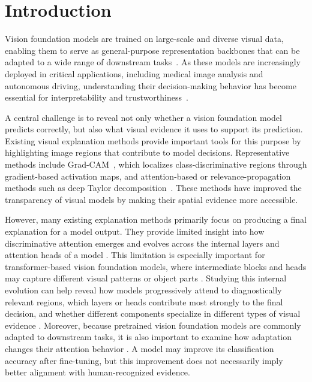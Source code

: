 \documentclass[lineno,pdflatex,sn-mathphys-num]{sn-jnl}%
\theoremstyle{thmstyleone}%
\theoremstyle{thmstyletwo}%
\theoremstyle{thmstylethree}%
\begin{document}


\maketitle

\clearpage

\section{Introduction}

Vision foundation models are trained on large-scale and diverse visual data, enabling them to serve as general-purpose representation backbones that can be adapted to a wide range of downstream tasks~\cite{Awais25PAMI}. As these models are increasingly deployed in critical applications, including medical image analysis and autonomous driving, understanding their decision-making behavior has become essential for interpretability and trustworthiness~\cite{Hasic26NN, Remi25IF, Wan26PAMI, Kashefi2026review}.

A central challenge is to reveal not only whether a vision foundation model predicts correctly, but also what visual evidence it uses to support its prediction. Existing visual explanation methods provide important tools for this purpose by highlighting image regions that contribute to model decisions. Representative methods include Grad-CAM~\cite{Selvaraju17GradCAM}, which localizes class-discriminative regions through gradient-based activation maps, and attention-based or relevance-propagation methods such as deep Taylor decomposition~\cite{Chefer21Interp}. These methods have improved the transparency of visual models by making their spatial evidence more accessible.

However, many existing explanation methods primarily focus on producing a final explanation for a model output. They provide limited insight into how discriminative attention emerges and evolves across the internal layers and attention heads of a model \cite{Voita19Heads}. This limitation is especially important for transformer-based vision foundation models, where intermediate blocks and heads may capture different visual patterns or object parts \cite{Caron21DINO}. Studying this internal evolution can help reveal how models progressively attend to diagnostically relevant regions, which layers or heads contribute most strongly to the final decision, and whether different components specialize in different types of visual evidence \cite{Raghu21ViTvsCNN}. Moreover, because pretrained vision foundation models are commonly adapted to downstream tasks, it is also important to examine how adaptation changes their attention behavior \cite{Kumar22Distort, Biderman24LoRA}. A model may improve its classification accuracy after fine-tuning, but this improvement does not necessarily imply better alignment with human-recognized evidence.
\end{document}
